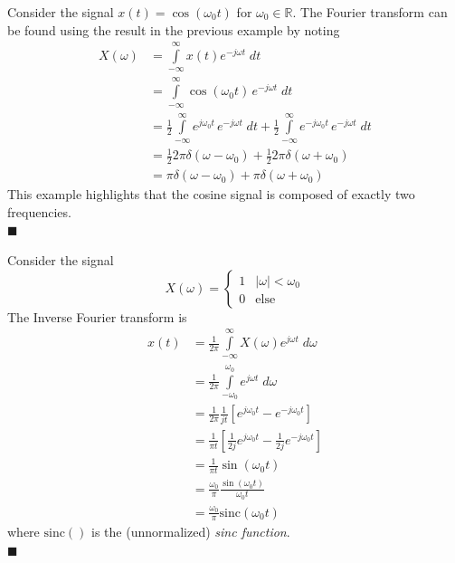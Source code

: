 \begin{example}
  Consider the signal $x(t) = \cos(\omega_0 t)$ for $\omega_0\in \mathbb{R}$.  The Fourier transform can be found using the result in the previous example by noting
  \begin{align*}
    X(\omega) &= \int\limits_{-\infty}^{\infty} x(t) e^{-j\omega t}\; dt\\
    &= \int\limits_{-\infty}^{\infty}  \cos(\omega_0 t) \, e^{-j\omega t}\; dt\\
    &= \frac{1}{2}\int\limits_{-\infty}^{\infty}   e^{j\omega_0 t} \, e^{-j\omega t}\; dt + \frac{1}{2}\int\limits_{-\infty}^{\infty} e^{-j\omega_0 t} \, e^{-j\omega t}\; dt\\
    &= \frac{1}{2} 2\pi \delta(\omega-\omega_0) + \frac{1}{2} 2\pi \delta(\omega+\omega_0)\\
    &= \pi \delta(\omega-\omega_0) + \pi \delta(\omega+\omega_0)
  \end{align*}
  This example highlights that the cosine signal is composed of exactly two frequencies.\\
  $\blacksquare$
\end{example}

\begin{example}
  Consider the signal
  \[
  X(\omega) = \begin{cases}
    1 & |\omega| < \omega_0\\
    0 & \text{else}
  \end{cases}
  \]
  The Inverse Fourier transform is
  \begin{align*}
    x(t) & = \frac{1}{2\pi} \int\limits_{-\infty}^{\infty} X(\omega)e^{j\omega t}\; d\omega\\
    &= \frac{1}{2\pi} \int\limits_{-\omega_0}^{\omega_0} e^{j\omega t}\; d\omega\\
    &= \frac{1}{2\pi} \frac{1}{jt} \left[ e^{j\omega_0 t} - e^{-j\omega_0 t}\right]\\
    &= \frac{1}{\pi t} \left[ \frac{1}{2j}e^{j\omega_0 t} - \frac{1}{2j} e^{-j\omega_0 t}\right]\\
    &= \frac{1}{\pi t} \sin(\omega_0 t)\\
    &= \frac{\omega_0}{\pi} \frac{\sin(\omega_0 t)}{\omega_0 t}\\
    &= \frac{\omega_0}{\pi} \mbox{sinc}(\omega_0 t)
  \end{align*}
  where $\mbox{sinc}()$ is the (unnormalized) \emph{sinc function}.\\
  $\blacksquare$
\end{example}

